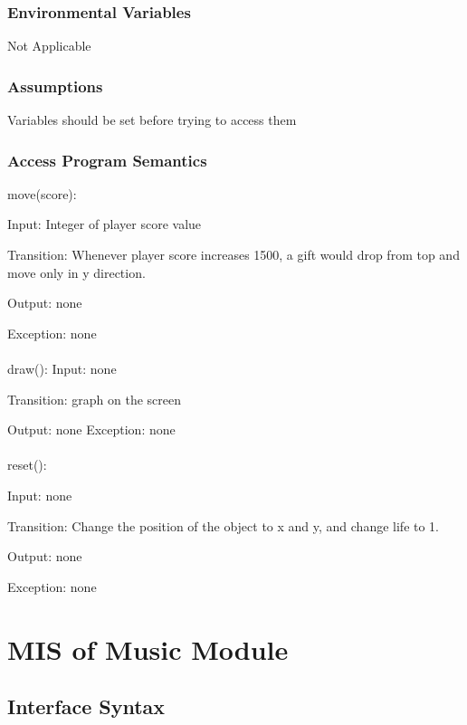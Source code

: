 \documentclass[12,english]{article}
\begin{document}
			\subsubsection{Environmental Variables}
			Not Applicable
			
			\subsubsection{Assumptions}
			Variables should be set before trying to access them
			
			\subsubsection{Access Program Semantics}
			move(score):
			
			Input: Integer of player score value
			
			Transition: Whenever player score increases 1500, a gift would drop from top and move only in y direction.
			
			Output: none
			
			Exception: none\\
			\\
			draw():
			Input: none
			
			Transition: graph on the screen
			
			Output: none
			Exception: none\\
			\\
			reset():
			
			Input: none
			
			Transition: Change the position of the object to x and y, and change life to 1.
			
			Output: none
			
			Exception: none

			
\section{MIS of Music Module}
		\subsection{Interface Syntax}
\end{document}
